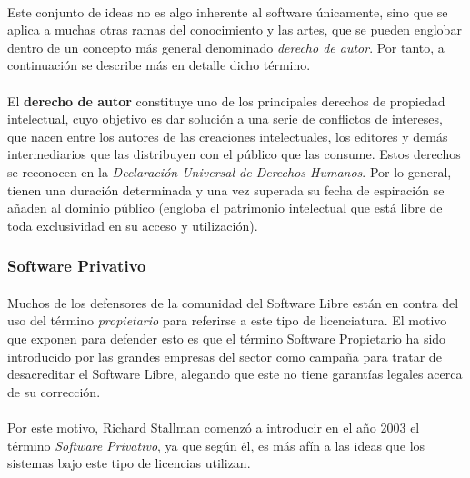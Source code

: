 \documentclass[10pt]{article}
\begin{document}
            	\paragraph{}
            	Este conjunto de ideas no es algo inherente al software únicamente, sino que se aplica a muchas otras ramas del conocimiento y las artes, que se pueden englobar dentro de un concepto más general denominado \emph{derecho de autor}. Por tanto, a continuación se describe más en detalle dicho término.
            
           		\paragraph{}
				El \textbf{derecho de autor} constituye uno de los principales derechos de propiedad intelectual, cuyo objetivo es dar solución a una serie de conflictos de intereses, que nacen entre los autores de las creaciones intelectuales, los editores y demás intermediarios que las distribuyen con el público que las consume. Estos derechos se reconocen en la \emph{Declaración Universal de Derechos Humanos}. Por lo general, tienen una duración determinada y una vez superada su fecha de espiración se añaden al dominio público (engloba el patrimonio intelectual que está libre de toda exclusividad en su acceso y utilización).

			\subsubsection{Software Privativo}

				\paragraph{}
                Muchos de los defensores de la comunidad del Software Libre están en contra del uso del término \emph{propietario} para referirse a este tipo de licenciatura. El motivo que exponen para defender esto es que el término Software Propietario ha sido introducido por las grandes empresas del sector como campaña para tratar de desacreditar el Software Libre, alegando que este no tiene garantías legales acerca de su corrección. 
                
                \paragraph{}
				Por este motivo,  Richard Stallman comenzó a introducir en el año 2003 el término \emph{Software Privativo}, ya que según él, es más afín a las ideas que los sistemas bajo este tipo de licencias utilizan. 
\end{document}
